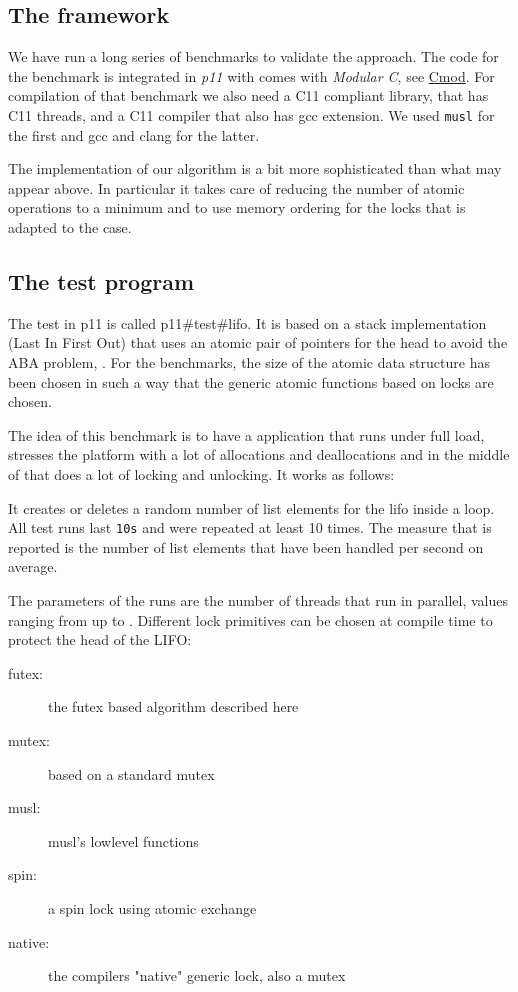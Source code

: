 \iflong%
\subsection{The framework}
\label{sec-4-1}

We have run a long series of benchmarks to validate the
approach. The code for the benchmark is integrated in \emph{p11} with
comes with \emph{Modular C}, see
\href{http://cmod.gforge.inria.fr}{Cmod}. For compilation of that
benchmark we also need a C11 compliant library, that has C11
threads, and a C11 compiler that also has gcc extension. We used
\texttt{musl} for the first and gcc and clang for the latter.

The implementation of our algorithm is a bit more sophisticated
than what may appear above. In particular it takes care of reducing
the number of atomic operations to a minimum and to use memory
ordering for the locks that is adapted to the case.

\subsection{The test program}
\label{sec-4-2}

The test in p11 is called p11\#test\#lifo. It is based on a stack
implementation (Last In First Out) that uses an atomic pair of
pointers for the head to avoid the ABA problem,
\cite{IBM370,michael04:aba}. For the benchmarks, the size of the atomic
data structure has been chosen in such a way that the generic
atomic functions based on locks are chosen.

The idea of this benchmark is to have a application that runs under
full load, stresses the platform with a lot of allocations and
deallocations and in the middle of that does a lot of locking and
unlocking. It works as follows:

It creates or deletes a random number of list elements for the lifo
inside a loop. All test runs last \texttt{10s} and were repeated at least
10 times. The measure that is reported is the number of list
elements that have been handled per second on average.

The parameters of the runs are the number of threads that run in
parallel, values ranging from  up to .  Different lock
primitives can be chosen at compile time to protect the head of the
LIFO:\itemadjust

\begin{description}
\item[{futex:}] the futex based algorithm described here
\item[{mutex:}] based on a standard mutex
\item[{musl:}] musl's lowlevel  functions
\item[{spin:}] a spin lock using atomic exchange
\item[{native:}] the compilers "native" generic lock, also a mutex
\end{description}

